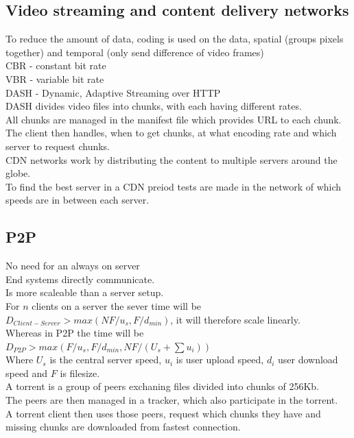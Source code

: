 \documentclass[12pt, a4paper]{article}
\begin{document}
		\subsection{Video streaming and content delivery networks}
			To reduce the amount of data, coding is used on the data, spatial (groups pixels together) and temporal (only send difference of video frames)\\
			CBR - constant bit rate\\
			VBR - variable bit rate\\
			DASH - Dynamic, Adaptive Streaming over HTTP\\
			DASH divides video files into chunks, with each having different rates.\\
			All chunks are managed in the manifest file which provides URL to each chunk.\\
			The client then handles, when to get chunks, at what encoding rate and which server to request chunks.\\
			CDN networks work by distributing the content to multiple servers around the globe.\\
			To find the best server in a CDN preiod tests are made in the network of which speeds are in between each server.\\
		\subsection{P2P}
			No need for an always on server\\
			End systems directly communicate.\\
			Is more scaleable than a server setup.\\
			For $n$ clients on a server the sever time will be $D_{Client-Server}>max(NF/u_s,F/d_{min})$, it will therefore scale linearly.\\
			Whereas in P2P the time will be $D_{P2P}>max(F/u_s,F/d_{min},NF/(U_s+\sum u_i))$\\
			Where $U_s$ is the central server speed, $u_i$ is user upload speed, $d_i$ user download speed and $F$ is filesize.\\
			A torrent is a group of peers exchaning files divided into chunks of 256Kb.\\
			The peers are then managed in a tracker, which also participate in the torrent.\\
			A torrent client then uses those peers, request which chunks they have and missing chunks are downloaded from fastest connection.\\
\end{document}
